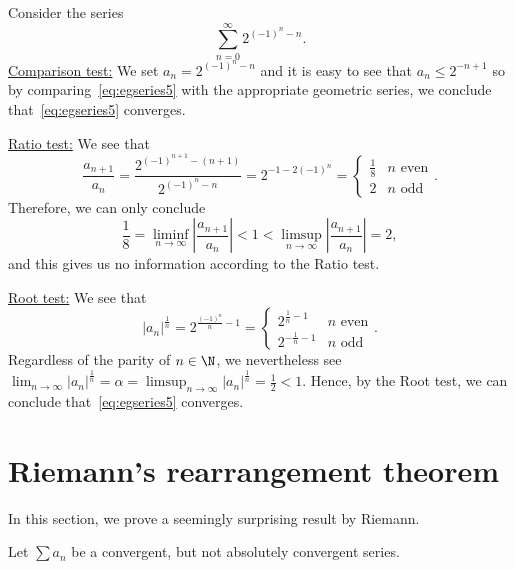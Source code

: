 \begin{eg}
	Consider the series
	\begin{equation}
		\label{eq:egseries5}
		\sum_{n=0}^\infty 2^{(-1)^n - n}.
	\end{equation}
	\ul{Comparison test:} We set $a_n = 2^{(-1)^n - n}$ and it is easy to see that $a_n \le 2^{-n+1}$ so by comparing~\eqref{eq:egseries5} with the appropriate geometric series, we conclude that~\eqref{eq:egseries5} converges.
	
	\ul{Ratio test:} We see that
	\[
	\frac{a_{n+1}}{a_n} = \frac{2^{(-1)^{n+1}-(n+1)}}{2^{(-1)^n - n}} = 2^{-1-2(-1)^n} = \left\{
	\begin{array}{cc}
		\frac{1}{8} 	&n\text{ even} 	\\
		2 	&n\text{ odd}
	\end{array}
	\right..
	\]
	Therefore, we can only conclude
	\[
	\frac{1}{8} = \liminf_{n\to\infty}\left|
	\frac{a_{n+1}}{a_n}
	\right|< 1< \limsup_{n\to\infty}\left|
	\frac{a_{n+1}}{a_n}
	\right| = 2,
	\]
	and this gives us no information according to the Ratio test.
	
	\ul{Root test:} We see that
	\[
	|a_n|^\frac{1}{n} = 2^{\frac{(-1)^n}{n}-1} = \left\{
	\begin{array}{cc}
		2^{\frac{1}{n}-1} 	&n\text{ even} 	\\
		2^{-\frac{1}{n}-1}  	&n\text{ odd}
	\end{array}
	\right..
	\]
	Regardless of the parity of $n\in\N$, we nevertheless see $\lim_{n\to\infty} |a_n|^\frac{1}{n} = \alpha = \limsup_{n\to\infty}|a_n|^\frac{1}{n} = \frac{1}{2}<1$. Hence, by the Root test, we can conclude that~\eqref{eq:egseries5} converges.
\end{eg}
\section{Riemann's rearrangement theorem}
\label{sec:rearrange}
In this section, we prove a seemingly surprising result by Riemann.
\begin{thm}
	\label{thm:rearrange}
	Let $\sum a_n$ be a convergent, but not absolutely convergent series.
\end{thm}
